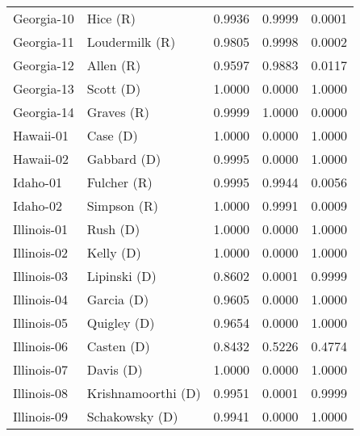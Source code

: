 \begin{longtable}{llrll}
        Georgia-10 &              {\color{Red} Hice (R)} &       0.9936 &        0.9999 &        0.0001 \\
        Georgia-11 &        {\color{Red} Loudermilk (R)} &       0.9805 &        0.9998 &        0.0002 \\
        Georgia-12 &             {\color{Red} Allen (R)} &       0.9597 &        0.9883 &        0.0117 \\
        Georgia-13 &            {\color{Blue} Scott (D)} &       1.0000 &        0.0000 &        1.0000 \\
        Georgia-14 &            {\color{Red} Graves (R)} &       0.9999 &        1.0000 &        0.0000 \\
         Hawaii-01 &             {\color{Blue} Case (D)} &       1.0000 &        0.0000 &        1.0000 \\
         Hawaii-02 &          {\color{Blue} Gabbard (D)} &       0.9995 &        0.0000 &        1.0000 \\
          Idaho-01 &           {\color{Red} Fulcher (R)} &       0.9995 &        0.9944 &        0.0056 \\
          Idaho-02 &           {\color{Red} Simpson (R)} &       1.0000 &        0.9991 &        0.0009 \\
       Illinois-01 &             {\color{Blue} Rush (D)} &       1.0000 &        0.0000 &        1.0000 \\
       Illinois-02 &            {\color{Blue} Kelly (D)} &       1.0000 &        0.0000 &        1.0000 \\
       Illinois-03 &         {\color{Blue} Lipinski (D)} &       0.8602 &        0.0001 &        0.9999 \\
       Illinois-04 &           {\color{Blue} Garcia (D)} &       0.9605 &        0.0000 &        1.0000 \\
       Illinois-05 &          {\color{Blue} Quigley (D)} &       0.9654 &        0.0000 &        1.0000 \\
       Illinois-06 &           {\color{Blue} Casten (D)} &       0.8432 &        0.5226 &        0.4774 \\
       Illinois-07 &            {\color{Blue} Davis (D)} &       1.0000 &        0.0000 &        1.0000 \\
       Illinois-08 &   {\color{Blue} Krishnamoorthi (D)} &       0.9951 &        0.0001 &        0.9999 \\
       Illinois-09 &       {\color{Blue} Schakowsky (D)} &       0.9941 &        0.0000 &        1.0000 \\

\end{longtable}
